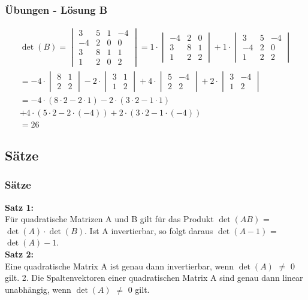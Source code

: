 \begin{frame}
	\frametitle{Übungen - Lösung B}
	\begin{gather*}
	 \det(B) = \begin{vmatrix}
		3 & 5 & 1 & -4 \\
		-4 & 2 & 0 & 0 \\
		3 & 8 & 1 & 1 \\
		1 & 2 & 0 & 2
		\end{vmatrix} 
		= 1 \cdot \begin{vmatrix}
		-4 & 2 & 0 \\
		3 & 8 & 1 \\
		1 & 2 & 2
		\end{vmatrix} + 1 \cdot \begin{vmatrix}
		3 & 5 & -4 \\
		-4 & 2 & 0 \\
		1 & 2 & 2
		\end{vmatrix} \\
		= -4 \cdot \begin{vmatrix} 8 & 1 \\ 2 & 2 \end{vmatrix}
		-2 \cdot \begin{vmatrix} 3 & 1 \\  1 & 2 \end{vmatrix}
		+4 \cdot \begin{vmatrix} 5 & -4 \\ 2 & 2 \end{vmatrix}
		+2 \cdot \begin{vmatrix} 3 & -4 \\ 1 & 2 \end{vmatrix}\\
		= -4 \cdot (8 \cdot 2 - 2 \cdot 1)
		-2 \cdot (3 \cdot 2 - 1 \cdot 1) \\
		+4 \cdot (5 \cdot 2 - 2 \cdot (-4))
		+ 2 \cdot (3 \cdot 2 - 1 \cdot (-4)) \\
		= 26
	\end{gather*}
\end{frame}

\subsection{Sätze}
\begin{frame}
	\frametitle{Sätze}
	\textbf{Satz 1:} \\
	Für quadratische Matrizen A und B gilt für das Produkt $\det(AB)$ = $\det(A) \cdot \det(B)$. Ist A invertierbar, so folgt daraus $\det(A-1)$ = $\det(A)-1$. \\
	$ $ \\
	\textbf{Satz 2:} \\
	Eine quadratische Matrix A ist genau dann invertierbar, wenn $\det(A)$ $\neq$ 0 gilt.
2. Die Spaltenvektoren einer quadratischen Matrix A sind genau dann linear unabhängig, wenn
$\det(A)$ $\neq$ 0 gilt. \\
\end{frame}


